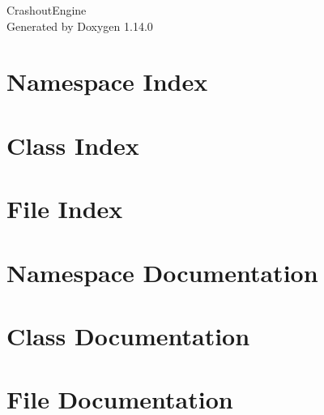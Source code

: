 \documentclass[twoside]{book}
\newcommand{\+}{\discretionary{\mbox{\scriptsize$\hookleftarrow$}}{}{}}
\newcommand{\clearemptydoublepage}{%
    \newpage{\pagestyle{empty}\cleardoublepage}%
  }
\begin{document}
  \raggedbottom
    \hypersetup{pageanchor=false,
                bookmarksnumbered=true,
                pdfencoding=unicode
               }
  \begin{titlepage}
  \vspace*{7cm}
  \begin{center}%
  {\Large Crashout\+Engine}\\
  \vspace*{1cm}
  {\large Generated by Doxygen 1.14.0}\\
  \end{center}
  \end{titlepage}
  \clearemptydoublepage
  \tableofcontents
  \clearemptydoublepage
  \hypersetup{pageanchor=true}
\chapter{Namespace Index}

\chapter{Class Index}

\chapter{File Index}

\chapter{Namespace Documentation}

\chapter{Class Documentation}










\chapter{File Documentation}





















  \backmatter
  \newpage
  \clearemptydoublepage
  \printindex
\end{document}
